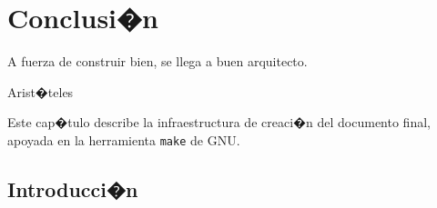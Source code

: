 %
%
%
%
%
%
%
%
%
%

\chapter{Conclusi�n}
\label{cap6}
\label{cap:makefile}

\begin{FraseCelebre}
\begin{Frase}
A fuerza de construir bien, se llega a buen arquitecto.
\end{Frase}
\begin{Fuente}
Arist�teles
\end{Fuente}
\end{FraseCelebre}

\begin{resumen}
Este cap�tulo describe la infraestructura de creaci�n del
documento final, apoyada en la herramienta \texttt{make}
de GNU.
\end{resumen}

\section{Introducci�n}
\label{cap6:sec:intro}


